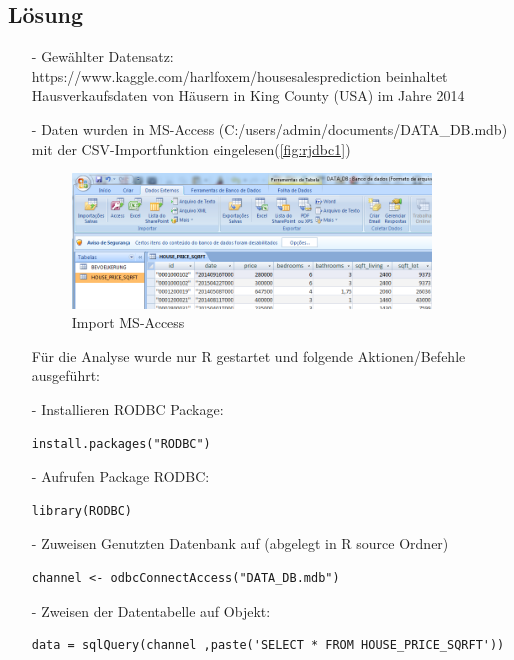 \subsection*{Lösung}
\begin{itemize}
\item[-]Gewählter Datensatz: https://www.kaggle.com/harlfoxem/housesalesprediction beinhaltet Hausverkaufsdaten von Häusern in King County (USA) im Jahre 2014
\item[-]Daten wurden in MS-Access (C:/users/admin/documents/DATA\_DB.mdb) mit der CSV-Importfunktion eingelesen(\autoref{fig:rjdbc1})
\begin{figure}[!htb]
        \begin{minipage}{1\textwidth}
                \centering
                \includegraphics[width=0.90\textwidth]{pics/rjdbc1.png}\par\vspace{0cm}
                \caption{Import MS-Access}
                \label{fig:rjdbc1}
        \end{minipage}
\end{figure}

Für die Analyse wurde nur R gestartet und folgende Aktionen/Befehle ausgeführt:
\item[-]Installieren RODBC Package:
\begin{lstlisting}
install.packages("RODBC")
\end{lstlisting}
\item[-]Aufrufen Package RODBC:
\begin{lstlisting}
library(RODBC)
\end{lstlisting}
\item[-]Zuweisen Genutzten Datenbank auf (abgelegt in R source Ordner)
\begin{lstlisting}
channel <- odbcConnectAccess("DATA_DB.mdb")
\end{lstlisting}

\item[-]Zweisen der Datentabelle auf Objekt:
\begin{lstlisting}
data = sqlQuery(channel ,paste('SELECT * FROM HOUSE_PRICE_SQRFT'))
\end{lstlisting}


\end{itemize}
